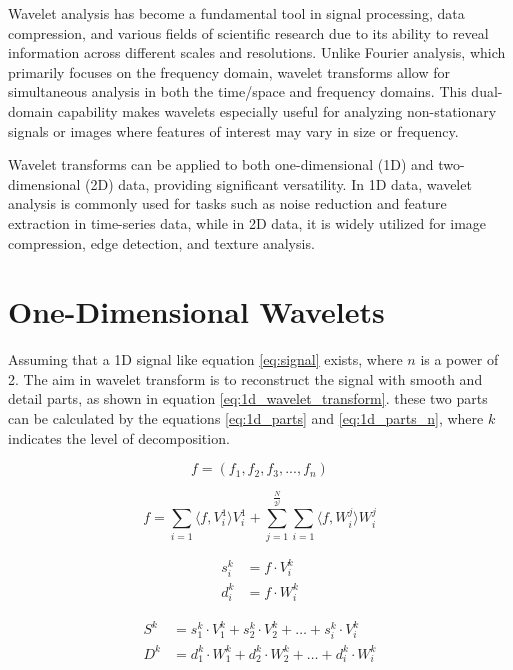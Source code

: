 \documentclass[12pt]{article}
\begin{document}
	Wavelet analysis has become a fundamental tool in signal processing, data compression, and various fields of scientific research due to its ability to reveal information across different scales and resolutions. Unlike Fourier analysis, which primarily focuses on the frequency domain, wavelet transforms allow for simultaneous analysis in both the time/space and frequency domains. This dual-domain capability makes wavelets especially useful for analyzing non-stationary signals or images where features of interest may vary in size or frequency.
	
	Wavelet transforms can be applied to both one-dimensional (1D) and two-dimensional (2D) data, providing significant versatility. In 1D data, wavelet analysis is commonly used for tasks such as noise reduction and feature extraction in time-series data, while in 2D data, it is widely utilized for image compression, edge detection, and texture analysis. 

	\section{One-Dimensional Wavelets}
	
	Assuming that a 1D signal like equation \ref{eq:signal} exists, where $n$ is a power of 2. The aim in wavelet transform is to reconstruct the signal with smooth and detail parts, as shown in equation \ref{eq:1d_wavelet_transform}. these two parts can be calculated by the equations \ref{eq:1d_parts} and \ref{eq:1d_parts_n}, where $k$ indicates the level of decomposition.
	
	\begin{equation}
		f=(f_1,f_2,f_3,...,f_n)
		\label{eq:signal}
	\end{equation}
	
	\begin{equation}
		f=\sum_{i=1} \langle f, V_{i}^1 \rangle V_{i}^1 + \sum_{j=1}^{\frac{N}{2^j}}\sum_{i=1}\langle f, W_{i}^j \rangle W_{i}^j
		\label{eq:1d_wavelet_transform}
	\end{equation}
	
	\begin{equation}
		\begin{aligned}
		s_i^k &= f \cdot V_i^k \\
		d_i^k &= f \cdot W_i^k
		\end{aligned}
		\label{eq:1d_parts}
	\end{equation}
	
		\begin{equation}
		\begin{aligned}
			S^k &= s_1^k \cdot V_1^k + s_2^k \cdot V_2^k + \dots + s_i^k \cdot V_i^k \\
			D^k &= d_1^k \cdot W_1^k + d_2^k \cdot W_2^k + \dots + d_i^k \cdot W_i^k
		\end{aligned}
		\label{eq:1d_parts_n}
	\end{equation}
	
\end{document}
